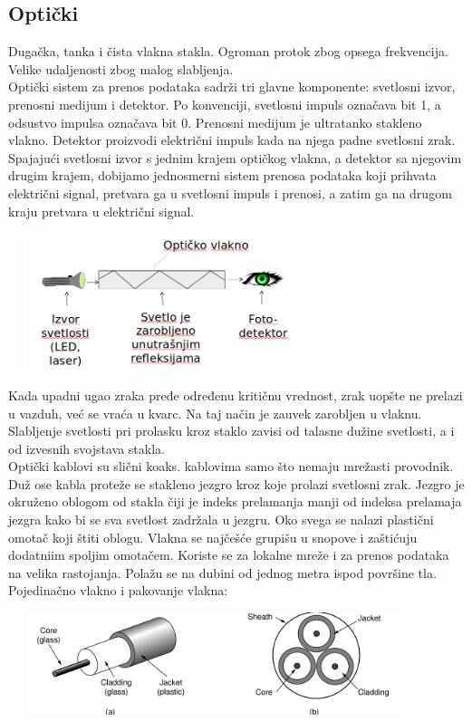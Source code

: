 \documentclass{article} %
\begin{document}
\subsection{Optički}
Dugačka, tanka i čista vlakna stakla. Ogroman protok zbog opsega frekvencija. Velike udaljenosti zbog malog slabljenja. \\
Optički sistem za prenos podataka sadrži tri glavne komponente: svetlosni izvor, prenosni medijum i detektor. Po konvenciji, svetlosni impuls označava bit 1, a odsustvo impulsa označava bit 0. Prenosni medijum je ultratanko stakleno vlakno. Detektor proizvodi električni impuls kada na njega padne svetlosni zrak. Spajajući svetlosni izvor s jednim krajem optičkog vlakna, a detektor sa njegovim drugim krajem, dobijamo jednosmerni sistem prenosa podataka koji prihvata električni signal, pretvara ga u svetlosni impuls i prenosi, a zatim ga na drugom kraju pretvara u električni signal.
\begin{center}
\includegraphics[width=9cm, height=4cm]{opticki1}\\
\end{center}
 Kada upadni ugao zraka pređe određenu kritičnu vrednost, zrak uopšte ne prelazi u vazduh, već se vraća u kvarc. Na taj način je zauvek zarobljen u vlaknu.\\
Slabljenje svetlosti pri prolasku kroz staklo zavisi od talasne dužine svetlosti, a i od izvesnih svojstava stakla. \\
Optički kablovi su slični koaks. kablovima samo što nemaju mrežasti provodnik.  Duž ose kabla proteže se stakleno jezgro kroz koje prolazi svetlosni zrak. Jezgro je okruženo oblogom od stakla čiji je indeks prelamanja manji od indeksa prelamaja jezgra kako bi se sva svetlost zadržala u jezgru. Oko svega se nalazi plastični omotač koji štiti oblogu. Vlakna se najčešće grupišu u snopove i zaštićuju dodatniim spoljim omotačem.
Koriste se za lokalne mreže i za prenos podataka na velika rastojanja. Polažu se na dubini od jednog metra ispod površine tla.\\

Pojedinačno vlakno i pakovanje vlakna:
\begin{center}
\includegraphics[width=12cm, height=3cm]{pojedinacno}
\end{center}
\end{document}
